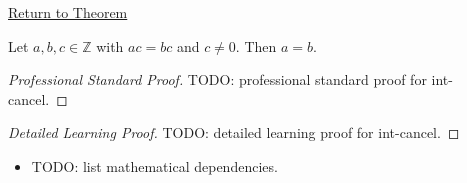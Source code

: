 \newpage
{}
\label{prf:int-cancel}

\begin{remark*}[Return]
\hyperref[cor:int-cancel]{Return to Theorem}
\end{remark*}

\begin{theorem*}
Let $a, b, c \in \mathbb{Z}$ with $ac = bc$ and $c \neq 0$. Then $a = b$.
\end{theorem*}

\begin{proof}[Professional Standard Proof]
\LRAProofBodyStart
TODO: professional standard proof for int-cancel.
\end{proof}

\begin{proof}[Detailed Learning Proof]
\LRAProofBodyStart
TODO: detailed learning proof for int-cancel.
\end{proof}

\begin{remark*}
\end{remark*}

\begin{dependencies}
\begin{itemize}
  \item TODO: list mathematical dependencies.
\end{itemize}
\end{dependencies}

\clearpage
